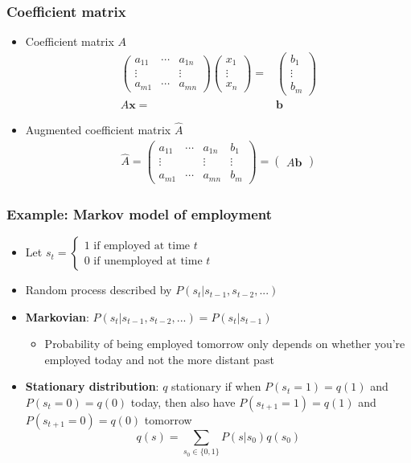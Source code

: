 \documentclass[compress]{beamer}
\begin{document}
\begin{frame}
  \frametitle{Coefficient matrix}
  \begin{itemize}
  \item Coefficient matrix $A$
    \begin{align*}
      \begin{pmatrix} a_{11} &  \cdots & a_{1n} \\
        \vdots & & \vdots \\
        a_{m1} & \cdots & a_{mn} 
      \end{pmatrix} 
      \begin{pmatrix} x_1 \\ \vdots \\ x_n
      \end{pmatrix} = & \begin{pmatrix} b_1 \\ \vdots \\ b_m
      \end{pmatrix} \\
      A \mathbf{x} = & \mathbf{b}
    \end{align*}
  \item Augmented coefficient matrix $\hat{A}$
    \begin{align*}
      \hat{A} =   \begin{pmatrix} a_{11} &  \cdots & a_{1n} & b_1 \\
        \vdots & & \vdots & \vdots \\
        a_{m1} & \cdots & a_{mn} & b_m 
      \end{pmatrix}  = \begin{pmatrix} A \mathbf{b}
      \end{pmatrix}
    \end{align*}
  \end{itemize}
\end{frame}

\begin{frame}
  \frametitle{Example: Markov model of employment}
  \begin{itemize}
  \item Let $s_t = \begin{cases} 1 \text{ if employed at time } t \\
      0 \text{ if unemployed at time } t
    \end{cases}$
  \item Random process described by $P(s_t | s_{t-1}, s_{t-2}, ... )$
  \item \textbf{Markovian}: $P(s_t | s_{t-1}, s_{t-2}, ... ) = P(s_t |
    s_{t-1})$
    \begin{itemize}
    \item Probability of being employed tomorrow only depends on
      whether you're employed today and not the more distant past
    \end{itemize}
  \item \textbf{Stationary distribution}: $q$ stationary if when $P(s_t = 1) = q(1)$ and $P(s_t
    = 0) = q(0)$ today, then also have $P(s_{t+1} = 1) = q(1)$ and
    $P(s_{t+1}=0) = q(0)$ tomorrow 
    \[ q(s) = \sum_{s_0 \in \{0, 1\} } P(s | s_0) q(s_0) \]
  \end{itemize}
\end{frame}
\end{document}
